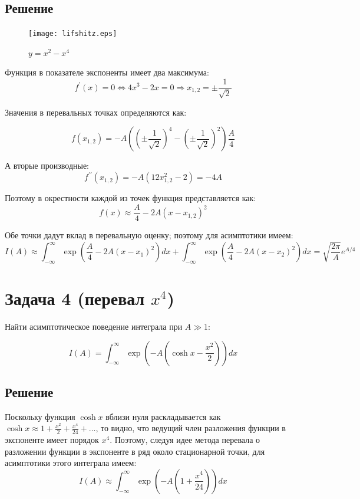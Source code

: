 \documentclass[a4paper,12pt]{article}
\begin{document}
\subsection{Решение}

\begin{figure}[h]
	\caption{$y=x^{2}-x^{4}$}
	\centering
	\texttt{[image: lifshitz.eps]}
\end{figure}

\noindent
Функция в показателе экспоненты имеет два максимума: 
\[
f^{\prime}(x)=0\Leftrightarrow4x^{3}-2x=0\Rightarrow x_{1,2}=\pm\frac{1}{\sqrt{2}}
\]

\noindent
Значения в перевальных точках определяются как:

\[
f(x_{1,2})=-A\left(\left(\pm\frac{1}{\sqrt{2}}\right)^{4}-\left(\pm\frac{1}{\sqrt{2}}\right)^{2}\right)\frac{A}{4}
\]

\noindent
А вторые производные:
\[
f^{\prime\prime}(x_{1,2})=-A(12x_{1,2}^{2}-2)=-4A
\]

\noindent
Поэтому в окрестности каждой из точек функция представляется как:
\[
f(x)\approx\frac{A}{4}-2A(x-x_{1,2})^{2}
\]

\noindent
Обе точки дадут вклад в перевальную оценку; поэтому для асимптотики
имеем:
\[
I\left(A\right)\approx\int_{-\infty}^{\infty}\exp\left(\frac{A}{4}-2A(x-x_{1})^{2}\right)dx+\int_{-\infty}^{\infty}\exp\left(\frac{A}{4}-2A(x-x_{2})^{2}\right)dx=\sqrt{\frac{2\pi}{A}}e^{A/4}
\]



\section{Задача 4 (перевал $x^4$)}

Найти асимптотическое поведение интеграла при $A\gg1$:

\[
I\left(A\right)=\int_{-\infty}^{\infty}\exp\left(-A\left(\cosh x-\frac{x^{2}}{2}\right)\right)dx
\]



\subsection{Решение}

Поскольку функция $\cosh x$ вблизи нуля раскладывается как $\cosh x\approx1+\frac{x^{2}}{2}+\frac{x^{4}}{24}+\dots$,
то видно, что ведущий член разложения функции в экспоненте имеет порядок
$x^{4}$. Поэтому, следуя идее метода перевала о разложении функции
в экспоненте в ряд около стационарной точки, для асимптотики этого
интеграла имеем:
\[
I(A)\approx\int_{-\infty}^{\infty}\exp\left(-A\left(1+\frac{x^{4}}{24}\right)\right)dx
\]
\end{document}
